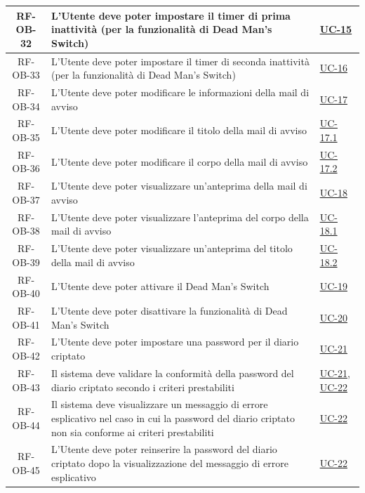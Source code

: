 \documentclass[a4paper,12pt]{article}
\begin{document}
\begin{center}
\begin{longtable}{|c|p{8.5cm}|>{\centering\arraybackslash}p{4cm}|}
\hline
\rowcolor{gray!20}
RF-OB-32 & L'Utente deve poter impostare il timer di prima inattività (per la funzionalità di Dead Man's Switch) & \hyperref[sec:UC-15]{UC-15} \\
\hline
\rowcolor{white}
RF-OB-33 & L'Utente deve poter impostare il timer di seconda inattività (per la funzionalità di Dead Man's Switch) & \hyperref[sec:UC-16]{UC-16} \\
\hline
\rowcolor{gray!20}
RF-OB-34 & L'Utente deve poter modificare le informazioni della mail di avviso & \hyperref[sec:UC-17]{UC-17} \\
\hline
\rowcolor{white}
RF-OB-35 & L'Utente deve poter modificare il titolo della mail di avviso & \hyperref[sec:UC-17.1]{UC-17.1} \\
\hline
\rowcolor{gray!20}
RF-OB-36 & L'Utente deve poter modificare il corpo della mail di avviso & \hyperref[sec:UC-17.2]{UC-17.2} \\
\hline
\rowcolor{white}
RF-OB-37 & L'Utente deve poter visualizzare un'anteprima della mail di avviso & \hyperref[sec:UC-18]{UC-18} \\
\hline
\rowcolor{gray!20}
RF-OB-38 & L'Utente deve poter visualizzare l'anteprima del corpo della mail di avviso & \hyperref[subsec:UC-18.1]{UC-18.1} \\
\hline
\rowcolor{white}
RF-OB-39 & L'Utente deve poter visualizzare un'anteprima del titolo della mail di avviso & \hyperref[subsec:UC-18.2]{UC-18.2} \\
\hline
\rowcolor{gray!20}
RF-OB-40 & L'Utente deve poter attivare il Dead Man's Switch & \hyperref[sec:UC-19]{UC-19} \\
\hline
\rowcolor{white}
RF-OB-41 & L'Utente deve poter disattivare la funzionalità di Dead Man's Switch & \hyperref[sec:UC-20]{UC-20} \\
\hline
\rowcolor{gray!20}
RF-OB-42 & L'Utente deve poter impostare una password per il diario criptato & \hyperref[subsec:UC-21]{UC-21} \\
\hline
\rowcolor{white}
RF-OB-43 & Il sistema deve validare la conformità della password del diario criptato secondo i criteri prestabiliti & \hyperref[subsec:UC-21]{UC-21}, \hyperref[subsec:UC-22]{UC-22} \\
\hline
\rowcolor{gray!20}
RF-OB-44 & Il sistema deve visualizzare un messaggio di errore esplicativo nel caso in cui la password del diario criptato non sia conforme ai criteri prestabiliti & \hyperref[subsec:UC-22]{UC-22} \\
\hline
\rowcolor{white}
RF-OB-45 & L'Utente deve poter reinserire la password del diario criptato dopo la visualizzazione del messaggio di errore esplicativo & \hyperref[subsec:UC-22]{UC-22} \\

\end{longtable}
\end{center}
\end{document}
